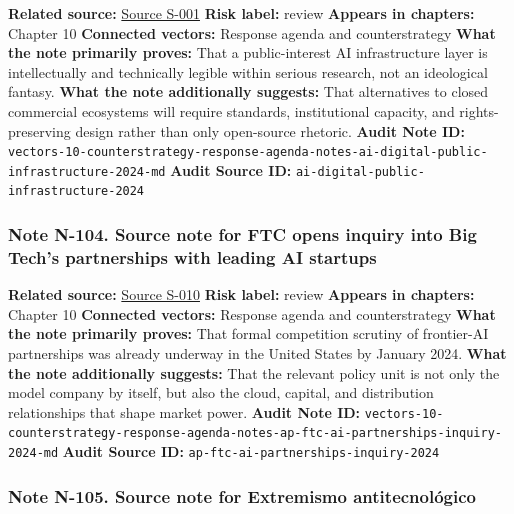 \documentclass[
  american,
  11pt,
  letterpaper,
]{article}
\begin{document}
\textbf{Related source:}
\hyperref[source-s-001-interactions-between-artificial-intelligence-and-digital-public-infrastructure-concepts-benefits-and-challenges]{Source
S-001} \textbf{Risk label:} review \textbf{Appears in chapters:} Chapter
10 \textbf{Connected vectors:} Response agenda and counterstrategy
\textbf{What the note primarily proves:} That a public-interest AI
infrastructure layer is intellectually and technically legible within
serious research, not an ideological fantasy. \textbf{What the note
additionally suggests:} That alternatives to closed commercial
ecosystems will require standards, institutional capacity, and
rights-preserving design rather than only open-source rhetoric.
\textbf{Audit Note ID:}
\texttt{vectors-10-counterstrategy-response-agenda-notes-ai-digital-public-infrastructure-2024-md}
\textbf{Audit Source ID:} \texttt{ai-digital-public-infrastructure-2024}

\subsubsection{Note N-104. Source note for FTC opens inquiry into Big
Tech's partnerships with leading AI
startups}\label{note-n-104-vectors-10-counterstrategy-response-agenda-notes-ap-ftc-ai-partnerships-inquiry-2024-md}

\textbf{Related source:}
\hyperref[source-s-010-ftc-opens-inquiry-into-big-tech-s-partnerships-with-leading-ai-startups]{Source
S-010} \textbf{Risk label:} review \textbf{Appears in chapters:} Chapter
10 \textbf{Connected vectors:} Response agenda and counterstrategy
\textbf{What the note primarily proves:} That formal competition
scrutiny of frontier-AI partnerships was already underway in the United
States by January 2024. \textbf{What the note additionally suggests:}
That the relevant policy unit is not only the model company by itself,
but also the cloud, capital, and distribution relationships that shape
market power. \textbf{Audit Note ID:}
\texttt{vectors-10-counterstrategy-response-agenda-notes-ap-ftc-ai-partnerships-inquiry-2024-md}
\textbf{Audit Source ID:} \texttt{ap-ftc-ai-partnerships-inquiry-2024}

\subsubsection{Note N-105. Source note for Extremismo
antitecnológico}\label{note-n-105-vectors-10-counterstrategy-response-agenda-notes-paul-lara-anti-technological-extremism-2026-md}
\end{document}
